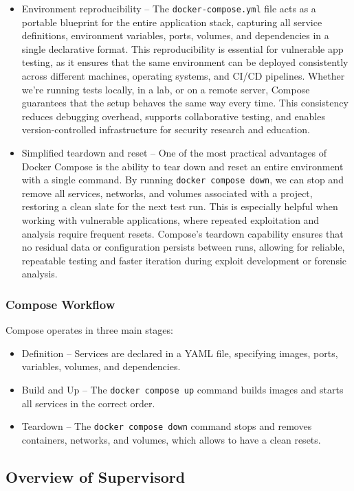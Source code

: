 \documentclass[12pt,titlepage]{article}
\begin{document}
\begin{itemize}
    \item{Environment reproducibility} – The \texttt{docker-compose.yml} file acts as a portable blue\-print for the entire application stack, capturing all service definitions, environment variables, ports, volumes, and dependencies in a single declarative format. This reproducibility is essential for vulnerable app testing, as it ensures that the same environment can be deployed consistently across different machines, operating systems, and CI/CD pipelines. Whether we're running tests locally, in a lab, or on a remote server, Compose guarantees that the setup behaves the same way every time. This consistency reduces debugging overhead, supports collaborative testing, and enables version-controlled infrastructure for security research and education.
    
    \item{Simplified teardown and reset} – One of the most practical advantages of Docker Compose is the ability to tear down and reset an entire environment with a single command. By running \texttt{docker compose down}, we can stop and remove all services, networks, and volumes associated with a project, restoring a clean slate for the next test run. This is especially helpful when working with vulnerable applications, where repeated exploitation and analysis require frequent resets. Compose’s teardown capability ensures that no residual data or configuration persists between runs, allowing for reliable, repeatable testing and faster iteration during exploit development or forensic analysis.
\end{itemize}

\subsubsection{Compose Workflow}
Compose operates in three main stages:
\begin{itemize}
    \item{Definition} – Services are declared in a YAML file, specifying images, ports, variables, volumes, and dependencies.
    \item{Build and Up} – The \texttt{docker compose up} command builds images and starts all services in the correct order.
    \item{Teardown} – The \texttt{docker compose down} command stops and removes containers, networks, and volumes, which allows to have a clean resets.
\end{itemize}

\subsection{Overview of Supervisord}
\end{document}
